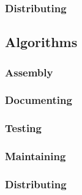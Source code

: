 \subsubsection{Distributing}

\subsection{Algorithms}

\subsubsection{Assembly}
\subsubsection{Documenting}
\subsubsection{Testing}
\subsubsection{Maintaining}
\subsubsection{Distributing}


